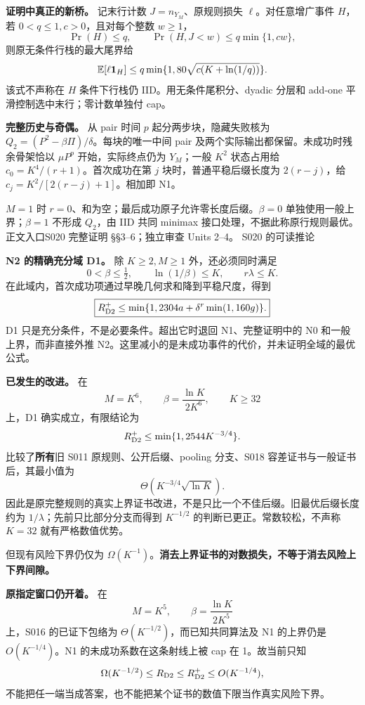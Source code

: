 \documentclass[11pt,a4paper]{article}
\newcommand{\head}[2]{{\small\sffamily #1}\par\vspace{2pt}{\LARGE\bfseries #2}\par\vspace{5pt}}
\newcommand{\entry}[1]{\vfill\noindent\small 正文入口\quad #1\normalsize}
\begin{document}
\textbf{证明中真正的新桥。} 记末行计数 $J=n_{Y_M}$、原规则损失 $\ell$。对任意增广事件 $H$，若 $0<q\le1,c>0$，且对每个整数 $w\ge1$，
\[
\Pr(H)\le q,\qquad \Pr(H,J<w)\le q\min\{1,cw\},
\]
则原无条件行栈的最大尾界给
\[
\mathbb E[\ell\mathbf1_H]\le q\min\{1,80\sqrt{c(K+\ln(1/q))}\}.
\]
该式不声称在 $H$ 条件下行栈仍 IID。用无条件尾积分、dyadic 分层和 add-one 平滑控制选中末行；零计数单独付 cap。

\textbf{完整历史与奇偶。} 从 pair 时间 $p$ 起分两步块，隐藏失败核为 $Q_2=(P^2-\beta\Pi)/\delta$。每块的唯一中间 pair 及两个实际输出都保留。未成功时残余骨架恰以 $\mu P^p$ 开始，实际终点仍为 $Y_M$；一般 $K^2$ 状态占用给 $c_0=K^4/(r+1)$。首次成功在第 $j$ 块时，普通平稳后缀长度为 $2(r-j)$，给 $c_j=K^2/[2(r-j)+1]$。相加即 N1。

$M=1$ 时 $r=0$、和为空；最后成功原子允许零长度后缀。$\beta=0$ 单独使用一般上界；$\beta=1$ 不形成 $Q_2$，由 IID 共同 minimax 接口处理，不据此称原行规则最优。
\entry{S020 完整证明 §§3--6；独立审查 Units 2--4。}
\newpage
\head{S020 的可读推论}{证书改进与真实风险缺口分开}
\textbf{N2 的精确充分域 D1。} 除 $K\ge2,M\ge1$ 外，还必须同时满足
\[
0<\beta\le\tfrac12,\qquad \ln(1/\beta)\le K,\qquad r\lambda\le K.
\]
在此域内，首次成功项通过早晚几何求和降到平稳尺度，得到
\[
\boxed{R_{\mathrm{D2}}^+\le\min\{1,2304a+\delta^r\min(1,160g)\}.}
\]
D1 只是充分条件，不是必要条件。超出它时退回 N1、完整证明中的 N0 和一般上界，而非直接外推 N2。这里减小的是未成功事件的代价，并未证明全域的最优公式。

\textbf{已发生的改进。} 在
\[
M=K^6,\qquad \beta=\frac{\ln K}{2K^6},\qquad K\ge32
\]
上，D1 确实成立，有限结论为
\[
R_{\mathrm{D2}}^+\le\min\{1,2544K^{-3/4}\}.
\]
比较了\textbf{所有}旧 S011 原规则、公开后缀、pooling 分支、S018 容差证书与一般证书后，其最小值为
\[
\Theta\!\left(K^{-3/4}\sqrt{\ln K}\right).
\]
因此是原完整规则的真实上界证书改进，不是只比一个不佳后缀。旧最优后缀长度约为 $1/\lambda$；先前只比部分分支而得到 $K^{-1/2}$ 的判断已更正。常数较松，不声称 $K=32$ 就有严格数值优势。

但现有风险下界仍仅为 $\Omega(K^{-1})$。\textbf{消去上界证书的对数损失，不等于消去风险上下界间隙。}

\textbf{原指定窗口仍开着。} 在
\[
M=K^5,\qquad \beta=\frac{\ln K}{2K^5}
\]
上，S016 的已证下包络为 $\Theta(K^{-1/2})$，而已知共同算法及 N1 的上界仍是 $O(K^{-1/4})$。N1 的未成功系数在这条射线上被 cap 在 1。故当前只知
\[
\Omega(K^{-1/2})\le R_{\mathrm{D2}}\le R_{\mathrm{D2}}^+\le O(K^{-1/4}),
\]
不能把任一端当成答案，也不能把某个证书的数值下限当作真实风险下界。
\end{document}
